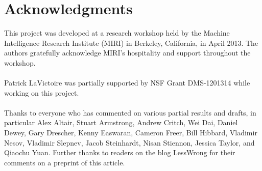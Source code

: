 \documentclass[12pt, letterpaper]{article}
\numberwithin{equation}{section}
\begin{document}
\section*{Acknowledgments}
This project was developed at a research workshop held by the Machine Intelligence Research Institute (MIRI) in Berkeley, California, in April 2013. The authors gratefully acknowledge MIRI's hospitality and support throughout the workshop.
\\
\\Patrick LaVictoire was partially supported by NSF Grant DMS-1201314 while working on this project.
\\
\\Thanks to everyone who has commented on various partial results and drafts, in particular Alex Altair, Stuart Armstrong, Andrew Critch, Wei Dai, Daniel Dewey, Gary Drescher, Kenny Easwaran, Cameron Freer, Bill Hibbard, Vladimir Nesov, Vladimir Slepnev, Jacob Steinhardt, Nisan Stiennon, Jessica Taylor, and Qiaochu Yuan. Further thanks to readers on the blog LessWrong for their comments on a preprint of this article.

{}

\end{document}
